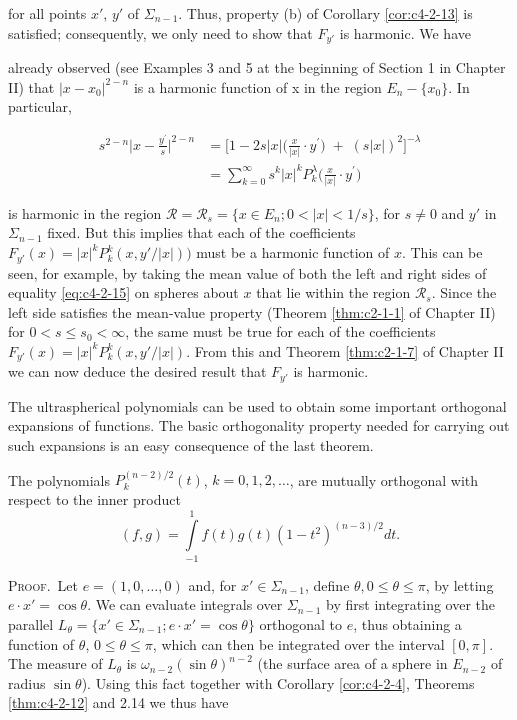 for all points $x'$, $y'$ of $\Sigma_{n-1}$. Thus, property (b) of Corollary \ref{cor:c4-2-13} is satisfied; consequently, we only need to show that $F_{y'}$ is harmonic. We have

already observed (see Examples 3 and 5 at the beginning of Section 1 in Chapter II) that $|x - x_0|^{2-n}$ is a harmonic function of x in the region $E_n - \{x_0\}$. In particular,

\begin{equation}\label{eq:c4-2-15}
\begin{aligned}s^{2-n}\Bigg|x-\frac{y^{\prime}}{s}\Bigg|^{2-n}&=\bigg[1-2s|x|\bigg(\frac{x}{|x|}\cdot y^{\prime}\bigg)\;+\;(s|x|)^{2}\bigg]^{-\lambda}\\&=\sum_{k=0}^{\infty}s^{k}|x|^{k} P_{k}^{\lambda}\bigg(\frac{x}{|x|}\cdot y^{\prime}\bigg)\end{aligned}
\end{equation}

is harmonic in the region $\mathcal{R} = \mathcal{R}_s = \{x \in E_n; 0 < |x| < 1/s\}$, for $s \neq 0$ and $y'$ in $\Sigma_{n-1}$ fixed. But this implies that each of the coefficients $F_{y'}(x) = |x|^k P_k^k(x, y'/|x|))$ must be a harmonic function of $x$. This can be seen, for example, by taking the mean value of both the left and right sides of equality \eqref{eq:c4-2-15} on spheres about $x$ that lie within the region $\mathcal{R}_s$. Since the left side satisfies the mean-value property (Theorem \ref{thm:c2-1-1} of Chapter II) for $0 < s \leq s_0 < \infty$, the same must be true for each of the coefficients $F_{y'}(x) = |x|^k P_k^k(x, y'/|x|)$. From this and Theorem \ref{thm:c2-1-7} of Chapter II we can now deduce the desired result that $F_{y'}$ is harmonic.

The ultraspherical polynomials can be used to obtain some important orthogonal expansions of functions. The basic orthogonality property needed for carrying out such expansions is an easy consequence of the last theorem.

\begin{corollary}
\label{cor:c4-2-16}
The polynomials $P_{k}^{(n-2)/2}(t)$, $k = 0, 1, 2, \ldots$, are mutually orthogonal with respect to the inner product
\[
(f,g)=\int\limits_{-1}^{1}f(t)g(t)(1-t^{2})^{(n-3)/2}d t.
\]

\end{corollary}

\textsc{Proof.}\ Let $e = (1, 0, \ldots, 0)$ and, for $x' \in \Sigma_{n-1}$, define $\theta, 0 \leq \theta \leq \pi$, by letting $e \cdot x' = \cos \theta$. We can evaluate integrals over $\Sigma_{n-1}$ by first integrating over the parallel $L_\theta = \{x' \in \Sigma_{n-1}; e \cdot x' = \cos \theta\}$ orthogonal to $e$, thus obtaining a function of $\theta$, $0 \leq \theta \leq \pi$, which can then be integrated over the interval $[0, \pi]$. The measure of $L_\theta$ is $\omega_{n-2}(\sin \theta)^{n-2}$ (the surface area of a sphere in $E_{n-2}$ of radius $\sin \theta$). Using this fact together with Corollary \ref{cor:c4-2-4}, Theorems \ref{thm:c4-2-12} and 2.14 we thus have


